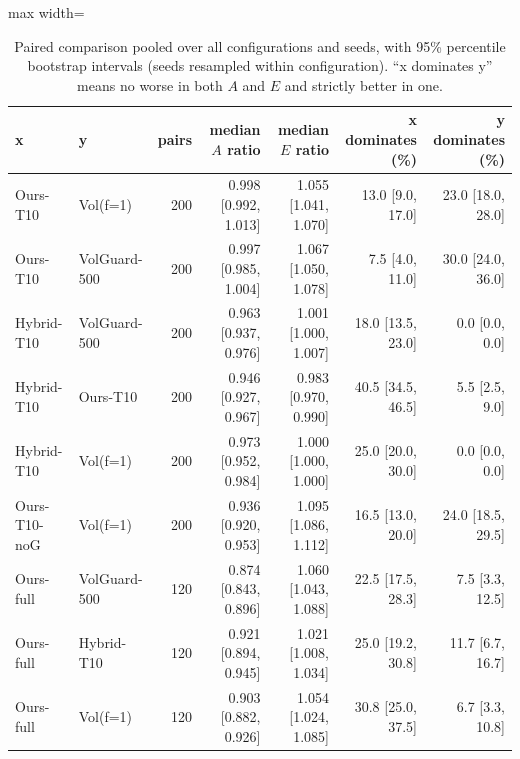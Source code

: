 \begin{table}[t]
\centering\small
\caption{Paired comparison pooled over all configurations and seeds, with 95\% percentile bootstrap intervals (seeds resampled within configuration). ``x dominates y'' means no worse in both $A$ and $E$ and strictly better in one.}\label{tab:pooled}
\begin{adjustbox}{max width=\linewidth}
\begin{tabular}{llrrrrr}
\toprule
x & y & pairs & median $A$ ratio & median $E$ ratio & x dominates (\%) & y dominates (\%) \\
\midrule
Ours-T10 & Vol(f=1) & 200 & 0.998 [0.992, 1.013] & 1.055 [1.041, 1.070] & 13.0 [9.0, 17.0] & 23.0 [18.0, 28.0] \\
Ours-T10 & VolGuard-500 & 200 & 0.997 [0.985, 1.004] & 1.067 [1.050, 1.078] & 7.5 [4.0, 11.0] & 30.0 [24.0, 36.0] \\
Hybrid-T10 & VolGuard-500 & 200 & 0.963 [0.937, 0.976] & 1.001 [1.000, 1.007] & 18.0 [13.5, 23.0] & 0.0 [0.0, 0.0] \\
Hybrid-T10 & Ours-T10 & 200 & 0.946 [0.927, 0.967] & 0.983 [0.970, 0.990] & 40.5 [34.5, 46.5] & 5.5 [2.5, 9.0] \\
Hybrid-T10 & Vol(f=1) & 200 & 0.973 [0.952, 0.984] & 1.000 [1.000, 1.000] & 25.0 [20.0, 30.0] & 0.0 [0.0, 0.0] \\
Ours-T10-noG & Vol(f=1) & 200 & 0.936 [0.920, 0.953] & 1.095 [1.086, 1.112] & 16.5 [13.0, 20.0] & 24.0 [18.5, 29.5] \\
Ours-full & VolGuard-500 & 120 & 0.874 [0.843, 0.896] & 1.060 [1.043, 1.088] & 22.5 [17.5, 28.3] & 7.5 [3.3, 12.5] \\
Ours-full & Hybrid-T10 & 120 & 0.921 [0.894, 0.945] & 1.021 [1.008, 1.034] & 25.0 [19.2, 30.8] & 11.7 [6.7, 16.7] \\
Ours-full & Vol(f=1) & 120 & 0.903 [0.882, 0.926] & 1.054 [1.024, 1.085] & 30.8 [25.0, 37.5] & 6.7 [3.3, 10.8] \\
\bottomrule
\end{tabular}
\end{adjustbox}
\end{table}
